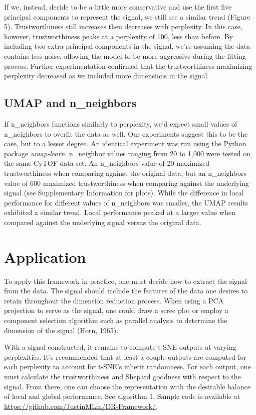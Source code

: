 \documentclass[webpdf,modern,large,namedate]{oup-authoring-template}
\theoremstyle{thmstyleone}%
\theoremstyle{thmstyletwo}%
\theoremstyle{thmstylethree}%
\begin{document}
If we, instead, decide to be a little more conservative and use the first five principal components to represent the signal, we still see a similar trend (Figure 5). Trustworthiness still increases then decreases with perplexity. In this case, however, trustworthiness peaks at a perplexity of 100, less than before. By including two extra principal components in the signal, we're assuming the data contains less noise, allowing the model to be more aggressive during the fitting process. Further experimentation confirmed that the trustworthiness-maximizing perplexity decreased as we included more dimensions in the signal.

\subsection{UMAP and n\_neighbors}
If n\_neighbors functions similarly to perplexity, we'd expect small values of n\_neighbors to overfit the data as well. Our experiments suggest this to be the case, but to a lesser degree. An identical experiment was run using the Python package \textit{umap-learn}. n\_neighbor values ranging from 20 to 1,000 were tested on the same CyTOF data set. An n\_neighbors value of 20 maximized trustworthiness when comparing against the original data, but an n\_neighbors value of 600 maximized trustworthiness when comparing against the underlying signal (see Supplementary Information for plots). While the difference in local performance for different values of n\_neighbors was smaller, the UMAP results exhibited a similar trend. Local performance peaked at a larger value when compared against the underlying signal versus the original data.

\section{Application}
To apply this framework in practice, one must decide how to extract the signal from the data. The signal should include the features of the data one desires to retain throughout the dimension reduction process. When using a PCA projection to serve as the signal, one could draw a scree plot or employ a component selection algorithm such as parallel analysis to determine the dimension of the signal (Horn, 1965).

With a signal constructed, it remains to compute t-SNE outputs at varying perplexities. It's recommended that at least a couple outputs are computed for each perplexity to account for t-SNE's inherit randomness. For each output, one must calculate the trustworthiness and Shepard goodness with respect to the signal. From there, one can choose the representation with the desirable balance of local and global performance. See algorithm 1. Sample code is available at \url{https://github.com/JustinMLin/DR-Framework/}.
\end{document}

